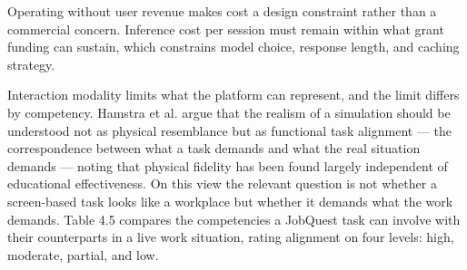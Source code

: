 Operating without user revenue makes cost a design constraint rather than a commercial concern. Inference cost per session must remain within what grant funding can sustain, which constrains model choice, response length, and caching strategy.

Interaction modality limits what the platform can represent, and the limit differs by competency. Hamstra et al.\cite{r98} argue that the realism of a simulation should be understood not as physical resemblance but as functional task alignment --- the correspondence between what a task demands and what the real situation demands --- noting that physical fidelity has been found largely independent of educational effectiveness. On this view the relevant question is not whether a screen-based task looks like a workplace but whether it demands what the work demands. Table 4.5 compares the competencies a JobQuest task can involve with their counterparts in a live work situation, rating alignment on four levels: high, moderate, partial, and low.


